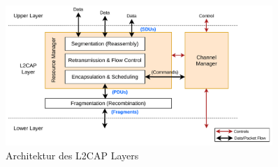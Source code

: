\begin{figure}[H]
    \centering
    \includegraphics[width=0.9\textwidth]{graphics/l2cap_architektur.pdf}
    \caption[Architektur des L2CAP Layers]{Architektur des L2CAP Layers \cite{BtSpec4.0_1391}}
    \label{fig: l2cap architektur}
\end{figure}

